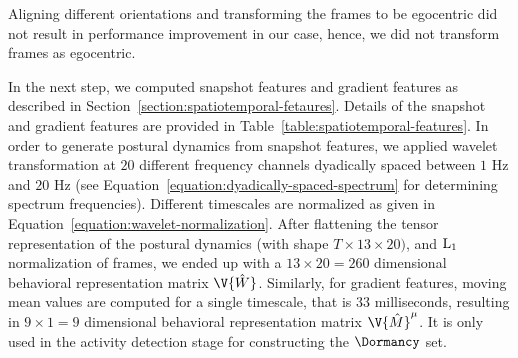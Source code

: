 Aligning different orientations and transforming the frames to be egocentric did not result in performance improvement in our case, hence, we did not transform frames as egocentric.

In the next step, we computed snapshot features and gradient features as described in Section~\ref{section:spatiotemporal-fetaures}.
Details of the snapshot and gradient features are provided in Table~\ref{table:spatiotemporal-features}.
In order to generate postural dynamics from snapshot features, we applied wavelet transformation at $20$ different frequency channels dyadically spaced between $1$ Hz and $20$ Hz (see Equation~\ref{equation:dyadically-spaced-spectrum} for determining spectrum frequencies).
Different timescales are normalized as given in Equation~\ref{equation:wavelet-normalization}.
After flattening the tensor representation of the postural dynamics (with shape $T \times 13 \times 20)$, and $\textnormal{L}_1$ normalization of frames, we ended up with a $13 \times 20 = 260$ dimensional behavioral representation matrix $\V{\hat{W}}$.
Similarly, for gradient features, moving mean values are computed for a single timescale, that is $33$ milliseconds, resulting in $9 \times 1 = 9$ dimensional behavioral representation matrix $\V{\hat{M}}^\mu$.
It is only used in the activity detection stage for constructing the $\Dormancy$ set.

